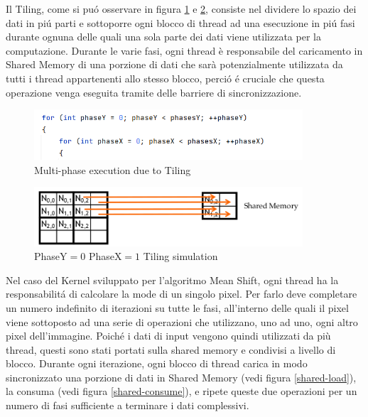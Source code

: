 \documentclass{article}
\begin{document}
\newpage

\noindent Il Tiling, come si pu\'o osservare in figura \ref{tilings-loops} e \ref{tiling}, consiste nel dividere lo spazio dei dati in pi\'u parti e sottoporre ogni blocco di thread ad una esecuzione in pi\'u fasi durante ognuna delle quali una sola parte dei dati viene utilizzata per la computazione. Durante le varie fasi, ogni thread è responsabile del caricamento in Shared Memory di una porzione di dati che sarà potenzialmente utilizzata da tutti i thread appartenenti allo stesso blocco, perci\'o \'e cruciale che questa operazione venga eseguita tramite delle barriere di sincronizzazione.

\vspace{15px}

\begin{figure}[!h]
\centering
\includegraphics[width= 10cm]{"Immagini/tiling-loops.PNG"}
\caption{Multi-phase execution due to Tiling}
\label{tilings-loops}
\end{figure}

\vspace{15px}

\begin{figure}[!h]
\centering
\includegraphics[width= 10cm]{"Immagini/Tiling.PNG"}
\caption{PhaseY$=0 $ PhaseX$=1 $ Tiling simulation}
\label{tiling}
\end{figure}

\vspace{15px}

\noindent Nel caso del Kernel sviluppato per l'algoritmo Mean Shift, ogni thread ha la responsabilit\'a di calcolare la mode di un singolo pixel. Per farlo deve completare un numero indefinito di iterazioni  su tutte le fasi, all'interno delle quali il pixel viene sottoposto ad una serie di operazioni che utilizzano, uno ad uno, ogni altro pixel dell'immagine. Poich\'e i dati di input vengono quindi utilizzati da più thread, questi sono stati portati sulla shared memory e condivisi a livello di blocco. Durante ogni iterazione, ogni blocco di thread carica in modo sincronizzato una porzione di dati in Shared Memory (vedi figura \ref{shared-load}), la consuma (vedi figura \ref{shared-consume}), e ripete queste due operazioni per un numero di fasi sufficiente a terminare i dati complessivi.
\end{document}
